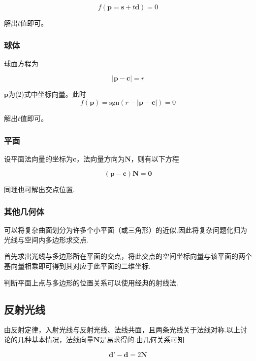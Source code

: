 \documentclass[10pt,twocolumn]{article}
\newcommand{\sgn}{\text{sgn}}
\begin{document}
\begin{equation}f(\mathbf{p}=\mathbf{s}+t\mathbf{d})=0\end{equation}

解出$t$值即可。

\subsubsection{\hei 球体}

球面方程为

\begin{equation}
|\mathbf{p}-\mathbf{c}|=r
\end{equation}

$\mathbf{p}$为(2)式中坐标向量。此时$$f(\mathbf{p})=\sgn(r-|\mathbf{p}-\mathbf{c}|)=0$$

解出$t$值即可。

\subsubsection{\hei 平面}

设平面法向量的坐标为$\mathbf{c}$，法向量方向为$\mathbf{N}$，则有以下方程

\begin{equation}
(\mathbf{p}-\mathbf{c})\mathbf{N}=\mathbf{0}
\end{equation}

同理也可解出交点位置.

\subsubsection{\hei 其他几何体}
可以将复杂曲面划分为许多个小平面（或三角形）的近似.因此将复杂问题化归为光线与空间内多边形求交点.

首先求出光线与多边形所在平面的交点，将此交点的空间坐标向量与该平面的两个基向量相乘即可得到其对应于此平面的二维坐标.

判断平面上点与多边形的位置关系可以使用经典的射线法.

\subsection{\hei 反射光线}
由反射定律，入射光线与反射光线、法线共面，且两条光线关于法线对称.以上讨论的几种基本情况，法线向量$\mathbf{N}$是易求得的.由几何关系可知

\begin{equation}
\mathbf{d'}-\mathbf{d}=2\mathbf{N}
\end{equation}
\end{document}
